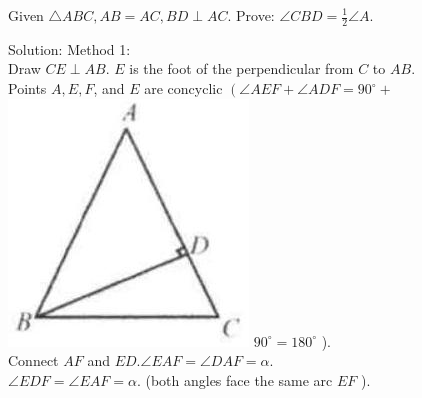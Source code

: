 \documentclass{article}
\begin{document}
Given \(\triangle A B C, A B=A C, B D \perp A C\). Prove: \(\angle C B D=\frac{1}{2} \angle A\).

Solution:
Method 1:\\
Draw \(C E \perp A B\). \(E\) is the foot of the perpendicular from \(C\) to \(A B\).\\
Points \(A, E, F\), and \(E\) are concyclic \(\left(\angle A E F+\angle A D F=90^{\circ}+\right.\)\\
\includegraphics[width=\textwidth]{images/194(2).jpg} \(90^{\circ}=180^{\circ}\) ).\\
Connect \(A F\) and \(E D . \angle E A F=\angle D A F=\alpha\).\\
\(\angle E D F=\angle E A F=\alpha\). (both angles face the same arc \(E F\) ).
\end{document}
